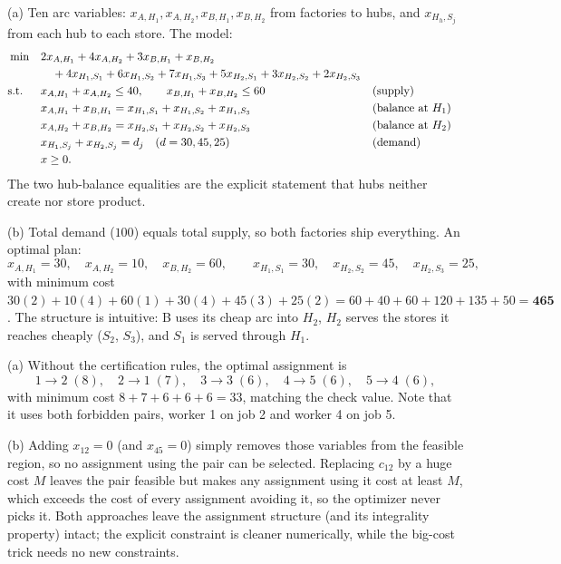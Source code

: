(a) Ten arc variables: $x_{A,H_1}, x_{A,H_2}, x_{B,H_1}, x_{B,H_2}$ from factories to hubs, and $x_{H_h,S_j}$ from each hub to each store. The model:
\begin{align*}
\min \quad & 2x_{A,H_1} + 4x_{A,H_2} + 3x_{B,H_1} + x_{B,H_2}\\
& \quad + 4x_{H_1,S_1} + 6x_{H_1,S_2} + 7x_{H_1,S_3} + 5x_{H_2,S_1} + 3x_{H_2,S_2} + 2x_{H_2,S_3}\\
\text{s.t.}\;\; \quad & x_{A,H_1} + x_{A,H_2} \leq 40, \qquad x_{B,H_1} + x_{B,H_2} \leq 60 && \text{(supply)}\\
& x_{A,H_1} + x_{B,H_1} = x_{H_1,S_1} + x_{H_1,S_2} + x_{H_1,S_3} && \text{(balance at } H_1)\\
& x_{A,H_2} + x_{B,H_2} = x_{H_2,S_1} + x_{H_2,S_2} + x_{H_2,S_3} && \text{(balance at } H_2)\\
& x_{H_1,S_j} + x_{H_2,S_j} = d_j \quad (d = 30, 45, 25) && \text{(demand)}\\
& x \geq 0.
\end{align*}
The two hub-balance equalities are the explicit statement that hubs neither create nor store product.

(b) Total demand ($100$) equals total supply, so both factories ship everything. An optimal plan:
\[
x_{A,H_1} = 30, \quad x_{A,H_2} = 10, \quad x_{B,H_2} = 60, \qquad x_{H_1,S_1} = 30, \quad x_{H_2,S_2} = 45, \quad x_{H_2,S_3} = 25,
\]
with minimum cost $30(2) + 10(4) + 60(1) + 30(4) + 45(3) + 25(2) = 60 + 40 + 60 + 120 + 135 + 50 = \mathbf{465}$. The structure is intuitive: B uses its cheap arc into $H_2$, $H_2$ serves the stores it reaches cheaply ($S_2$, $S_3$), and $S_1$ is served through $H_1$.


(a) Without the certification rules, the optimal assignment is
\[
1 \to 2 \;(8), \quad 2 \to 1 \;(7), \quad 3 \to 3 \;(6), \quad 4 \to 5 \;(6), \quad 5 \to 4 \;(6),
\]
with minimum cost $8 + 7 + 6 + 6 + 6 = 33$, matching the check value. Note that it uses both forbidden pairs, worker 1 on job 2 and worker 4 on job 5.

(b) Adding $x_{12} = 0$ (and $x_{45} = 0$) simply removes those variables from the feasible region, so no assignment using the pair can be selected. Replacing $c_{12}$ by a huge cost $M$ leaves the pair feasible but makes any assignment using it cost at least $M$, which exceeds the cost of every assignment avoiding it, so the optimizer never picks it. Both approaches leave the assignment structure (and its integrality property) intact; the explicit constraint is cleaner numerically, while the big-cost trick needs no new constraints.

